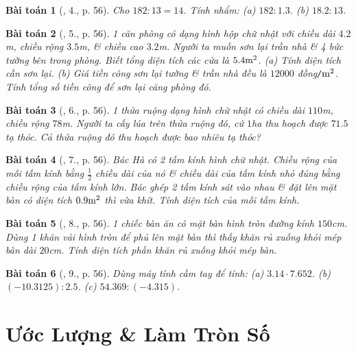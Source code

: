 \documentclass{article}
\newtheorem{baitoan}{Bài toán}
\begin{document}
\begin{baitoan}[\cite{SGK_Toan_6_Canh_Dieu_tap_2}, 4., p. 56]
	Cho $182:13 = 14$. Tính nhẩm: (a) $182:1.3$. (b) $18.2:13$.
\end{baitoan}

\begin{baitoan}[\cite{SGK_Toan_6_Canh_Dieu_tap_2}, 5., p. 56]
	1 căn phòng có dạng hình hộp chữ nhật với chiều dài $4.2$\emph{m}, chiều rộng $3.5$\emph{m}, \& chiều cao $3.2$\emph{m}. Người ta muốn sơn lại trần nhà \& 4 bức tường bên trong phòng. Biết tổng diện tích các cửa là $\rm5.4m^2$. (a) Tính diện tích cần sơn lại. (b) Giá tiền công sơn lại tường \& trần nhà đều là $12000$ \emph{đồng\texttt{/}$\rm m^2$}. Tính tổng số tiền công để sơn lại căng phòng đó.
\end{baitoan}

\begin{baitoan}[\cite{SGK_Toan_6_Canh_Dieu_tap_2}, 6., p. 56]
	1 thửa ruộng dạng hình chữ nhật có chiều dài $110$\emph{m}, chiều rộng $78$\emph{m}. Người ta cấy lúa trên thửa ruộng đó, cứ $1$\emph{ha} thu hoạch được $71.5$ tạ thóc. Cả thửa ruộng đó thu hoạch được bao nhiêu tạ thóc?
\end{baitoan}

\begin{baitoan}[\cite{SGK_Toan_6_Canh_Dieu_tap_2}, 7., p. 56]
	Bác Hà có 2 tấm kính hình chữ nhật. Chiều rộng của mỗi tấm kính bằng $\frac{1}{2}$ chiều dài của nó \& chiều dài của tấm kính nhỏ đúng bằng chiều rộng của tấm kính lớn. Bác ghép 2 tấm kính sát vào nhau \& đặt lên mặt bàn có diện tích $\rm0.9m^2$ thì vừa khít. Tính diện tích của mỗi tấm kính.
\end{baitoan}

\begin{baitoan}[\cite{SGK_Toan_6_Canh_Dieu_tap_2}, 8., p. 56]
	1 chiếc bàn ăn có mặt bàn hình tròn đường kính $150$\emph{cm}. Dùng 1 khăn vải hình tròn để phủ lên mặt bàn thì thấy khăn rủ xuống khỏi mép bàn dài $20$\emph{cm}. Tính diện tích phần khăn rủ xuống khỏi mép bàn.
\end{baitoan}

\begin{baitoan}[\cite{SGK_Toan_6_Canh_Dieu_tap_2}, 9., p. 56]
	Dùng máy tính cầm tay để tính: (a) $3.14\cdot7.652$. (b) $(-10.3125):2.5$. (c) $54.369:(-4.315)$.
\end{baitoan}


\section{Ước Lượng \& Làm Tròn Số}
\end{document}
